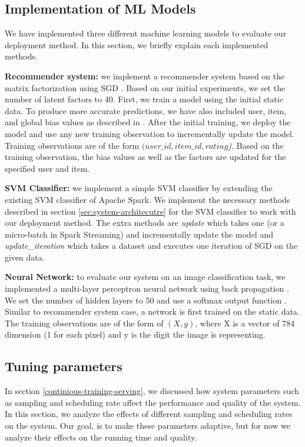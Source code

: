 \documentclass{vldb}
\begin{document}
\subsection{Implementation of ML Models}
We have implemented three different machine learning models to evaluate our deployment method.
In this section, we briefly explain each implemented methods.

\textbf{Recommender system:} we implement a recommender system based on the matrix factorization using SGD \cite{funk2006netflix}.
Based on our initial experiments, we set the number of latent factors to 40.
First, we train a model using the initial static data.
To produce more accurate predictions, we have also included user, item, and global bias values as described in \cite{koren2009matrix}.
After the initial training, we deploy the model and use any new training observation to incrementally update the model.
Training observations are of the form \textit{\((user\_id, item\_id, rating\))}.
Based on the training observation, the bias values as well as the factors are updated for the specified user and item.

\textbf{SVM Classifier:} we implement a simple SVM classifier by extending the existing SVM classifier of Apache Spark.
We implement the necessary methods described in section \ref{sec:system-architecutre} for the SVM classifier to work with our deployment method.
The extra methods are \textit{update} which takes one (or a micro-batch in Spark Streaming) and incrementally update the model and \textit{update\_iteration} which takes a dataset and executes one iteration of SGD on the given data.

\textbf{Neural Network:} to evaluate our system on an image classification task, we implemented a multi-layer perceptron neural network using back propagation \cite{collobert2004links}.
We set the number of hidden layers to 50 and use a softmax output function \cite{bishop2006pattern}.
Similar to recommender system case, a network is first trained on the static data.
The training observations are of the form of \textit{\((X,y)\)}, where X is a vector of 784 dimension (1 for each pixel) and y is the digit the image is representing.

\subsection{Tuning parameters} \label{tuning}
In section \ref{continious-training-serving}, we discussed how system parameters such as sampling and scheduling rate affect the performance and quality of the system.
In this section, we analyze the effects of different sampling and scheduling rates on the system.
Our goal, is to make these parameters adaptive, but for now we analyze their effects on the running time and quality. 
\end{document}
